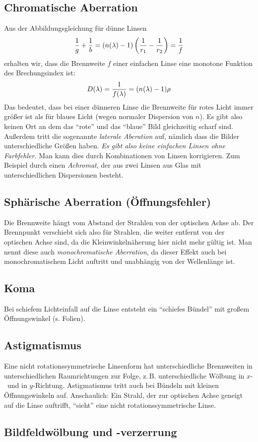 \subsection{Chromatische Aberration}
Aus der Abbildungsgleichung für dünne Linsen
\begin{align*}
  \frac{1}{g} + \frac{1}{b}
  = (n(\lambda)-1) \left( \frac{1}{r_1} - \frac{1}{r_2} \right)
  = \frac{1}{f}
\end{align*}
erhalten wir, dass die Brennweite $f$ einer einfachen Linse eine
monotone Funktion des Brechungsindex ist:
\begin{align*}
  D(\lambda) 
  = \frac{1}{f(\lambda)}
  = (n(\lambda)-1)\rho
\end{align*}
Das bedeutet, dass bei einer dünneren Linse die Brennweite für rotes
Licht immer größer ist als für blaues Licht (wegen normaler Dispersion
von $n$).
Es gibt also keinen Ort an dem das \enquote{rote} und das
\enquote{blaue} Bild gleichzeitig scharf sind. Außerdem tritt die
sogenannte \emph{laterale Aberation}
auf, nämlich dass die Bilder unterschiedliche Größen haben.
\emph{Es gibt also keine einfachen Linsen ohne Farbfehler.}
Man kann dies durch Kombinationen von Linsen korrigieren. Zum Beispiel
durch einen \emph{Achromat}, der aus zwei Linsen aus Glas mit
unterschiedlichen Dispersionen besteht.

\subsection{Sphärische Aberration (Öffnungsfehler)}
Die Brennweite hängt vom Abstand der Strahlen von der optischen Achse
ab. Der Brennpunkt verschiebt sich also für Strahlen, die weiter
entfernt von der optischen Achse sind, da die Kleinwinkelnäherung hier
nicht mehr gültig ist.
Man nennt diese auch \emph{monochromatische Aberration}, da dieser
Effekt auch bei monochromatischem Licht auftritt und unabhängig von
der Wellenlänge ist.


\subsection{Koma}
Bei schiefem Lichteinfall auf die Linse entsteht ein \enquote{schiefes
  Bündel} mit großem Öffnungswinkel (s. Folien).

\subsection{Astigmatismus}
Eine nicht rotationssymmetrische Linsenform hat unterschiedliche
Brennweiten in unterschiedlichen Raumrichtungen zur Folge,
z.\,B. unterschiedliche Wölbung in $x$-~und in $y$-Richtung.
Astigmatismus tritt auch bei Bündeln mit kleinen Öffnungswinkeln auf.
Anschaulich: Ein Strahl, der zur optischen Achse geneigt auf die Linse
auftrifft, \enquote{sieht} eine nicht rotationssymmetrische Linse.


\subsection{Bildfeldwölbung und -verzerrung}
\sFolien


